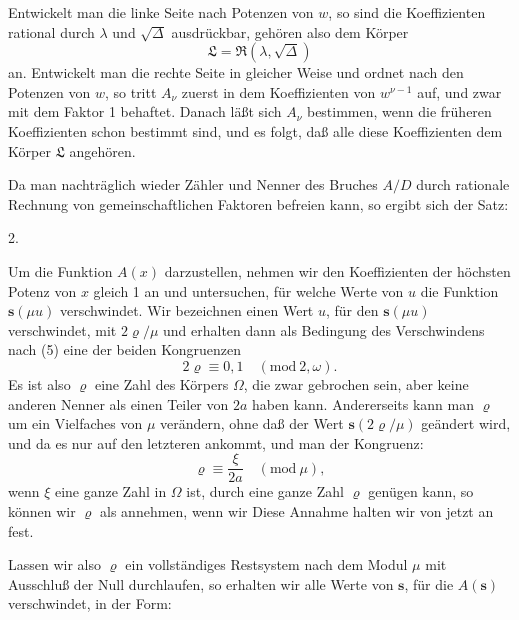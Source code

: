Entwickelt man die linke Seite nach Potenzen von $w$, so sind
die Koeffizienten rational durch $\lambda$ und $\sqrt{\Delta}$ ausdrückbar, gehören
also dem Körper
\[
\mathfrak{L} = \mathfrak{R}(\lambda, \sqrt{\Delta})
\]
an. Entwickelt man die rechte Seite in gleicher Weise und
ordnet nach den Potenzen von $w$, so tritt $A_\nu$ zuerst in dem
Koeffizienten von $w^{\nu-1}$ auf, und zwar mit dem Faktor 1 behaftet.
Danach läßt sich $A_\nu$ bestimmen, wenn die früheren Koeffizienten
schon bestimmt sind, und es folgt, daß alle diese Koeffizienten
dem Körper $\mathfrak{L}$ angehören.

Da man nachträglich wieder Zähler und Nenner des Bruches
$A/D$ durch rationale Rechnung von gemeinschaftlichen Faktoren
befreien kann, so ergibt sich der Satz:

2. 

Um die Funktion $A(x)$ darzustellen, nehmen wir den Koeffizienten
 der höchsten Potenz von $x$ gleich 1 an und untersuchen,
für welche Werte von $u$ die Funktion $\boldsymbol{s}(\mu u)$ verschwindet. Wir
bezeichnen einen Wert $u$, für den $\boldsymbol{s}(\mu u)$ verschwindet, mit $2\varrho/\mu$
und erhalten dann als Bedingung des Verschwindens nach (5)
eine der beiden Kongruenzen
\[
2\varrho \equiv 0, 1 \quad (\mathrm{mod}\ 2, \omega).
\]
Es ist also $\varrho$ eine Zahl des Körpers $\Omega$, die zwar gebrochen
sein, aber keine anderen Nenner als einen Teiler von $2a$ haben
kann. Andererseits kann man $\varrho$ um ein Vielfaches von $\mu$ verändern,
ohne daß der Wert $\boldsymbol{s}(2\varrho/\mu)$ geändert wird, und da es
nur auf den letzteren ankommt, und man der Kongruenz:
\[
\varrho \equiv \frac{\xi}{2a} \quad (\mathrm{mod}\ \mu),
\]
wenn $\xi$ eine ganze Zahl in $\Omega$ ist, durch eine ganze Zahl $\varrho$ genügen
kann, so können wir $\varrho$ als  annehmen, wenn wir  Diese Annahme halten wir von jetzt an
fest.

Lassen wir also $\varrho$ ein vollständiges Restsystem nach dem
Modul $\mu$ mit Ausschluß der Null durchlaufen, so erhalten wir
alle Werte von $\boldsymbol{s}$, für die $A(\boldsymbol{s})$ verschwindet, in der Form:
